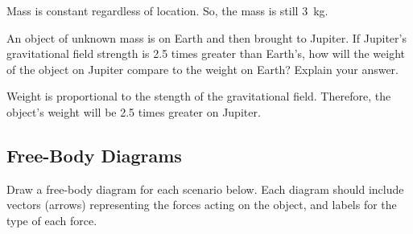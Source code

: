 \documentclass[]{exam}
\theoremstyle{definition}
\begin{document}
\begin{questions}
\begin{solution}
Mass is constant regardless of location. So, the mass is still \SI{3}{kg}.
\end{solution}

\ifprintanswers
\else
\fillwithlines{14mm}
\fi


\question
An object of unknown mass is on Earth and then brought to Jupiter. If Jupiter's gravitational field strength is 2.5 times greater than Earth's, how will the weight of the object on Jupiter compare to the weight on Earth? Explain your answer.

\begin{solution}
    Weight is proportional to the stength of the gravitational field. Therefore, the object's weight will be 2.5 times greater on Jupiter.
\end{solution}

\ifprintanswers
\else
\fillwithlines{14mm}
\fi



\end{questions}

\clearpage


\subsection*{Free-Body Diagrams}

Draw a free-body diagram for each scenario below. Each diagram should include vectors (arrows) representing the forces acting on the object, and labels for the type of each force. 
\end{document}
